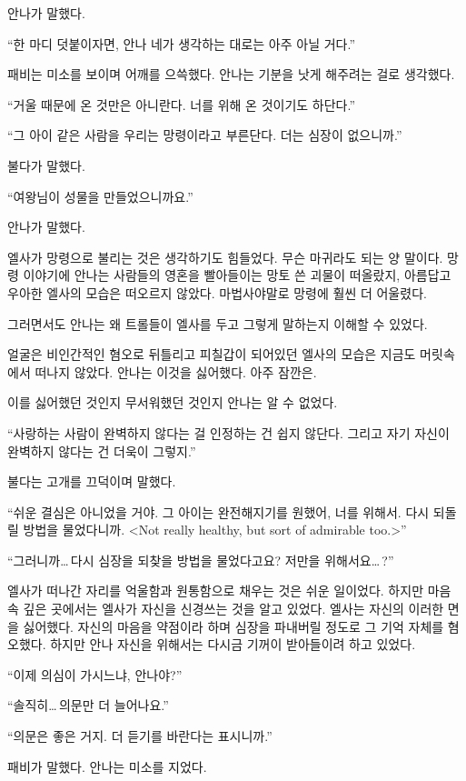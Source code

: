 안나가 말했다.

``한 마디 덧붙이자면, 안나 네가 생각하는 대로는 아주 아닐 거다.''

패비는 미소를 보이며 어깨를 으쓱했다. 안나는 기분을 낫게 해주려는 걸로 생각했다.

``거울 때문에 온 것만은 아니란다. 너를 위해 온 것이기도 하단다.''

``그 아이 같은 사람을 우리는 망령이라고 부른단다. 더는 심장이 없으니까.''

불다가 말했다.

``여왕님이 성물을 만들었으니까요.''

안나가 말했다.

엘사가 망령으로 불리는 것은 생각하기도 힘들었다. 무슨 마귀라도 되는 양 말이다. 망령 이야기에 안나는 사람들의 영혼을 빨아들이는 망토 쓴 괴물이 떠올랐지, 아름답고 우아한 엘사의 모습은 떠오르지 않았다. 마법사야말로 망령에 훨씬 더 어울렸다.

그러면서도 안나는 왜 트롤들이 엘사를 두고 그렇게 말하는지 이해할 수 있었다.

얼굴은 비인간적인 혐오로 뒤틀리고 피칠갑이 되어있던 엘사의 모습은 지금도 머릿속에서 떠나지 않았다. 안나는 이것을 싫어했다. 아주 잠깐은.

이를 싫어했던 것인지 무서워했던 것인지 안나는 알 수 없었다.

``사랑하는 사람이 완벽하지 않다는 걸 인정하는 건 쉽지 않단다. 그리고 자기 자신이 완벽하지 않다는 건 더욱이 그렇지.''

불다는 고개를 끄덕이며 말했다.

``쉬운 결심은 아니었을 거야. 그 아이는 완전해지기를 원했어, 너를 위해서. 다시 되돌릴 방법을 물었다니까. <Not really healthy, but sort of admirable too.>''

``그러니까\ldots\,다시 심장을 되찾을 방법을 물었다고요? 저만을 위해서요\ldots\,?''

엘사가 떠나간 자리를 억울함과 원통함으로 채우는 것은 쉬운 일이었다. 하지만 마음 속 깊은 곳에서는 엘사가 자신을 신경쓰는 것을 알고 있었다. 엘사는 자신의 이러한 면을 싫어했다. 자신의 마음을 약점이라 하며 심장을 파내버릴 정도로 그 기억 자체를 혐오했다. 하지만 안나 자신을 위해서는 다시금 기꺼이 받아들이려 하고 있었다.

``이제 의심이 가시느냐, 안나야?''

``솔직히\ldots\,의문만 더 늘어나요.''

``의문은 좋은 거지. 더 듣기를 바란다는 표시니까.''

패비가 말했다. 안나는 미소를 지었다.

